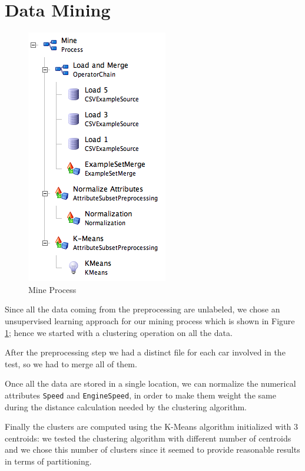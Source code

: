 \section{Data Mining}
\label{section:mining}

\begin{figure}
\vspace{-1.2cm}
\begin{center}
\includegraphics[scale=0.7]{images/mine.png}
\end{center}
\caption{Mine Process}
\label{figure:mine}
\end{figure}

Since all the data coming from the preprocessing are unlabeled, we chose an unsupervised learning approach for our mining process which is shown in Figure \ref{figure:mine}; hence we started with a clustering operation on all the data.

After the preprocessing step we had a distinct file for each car involved in the test, so we had to merge all of them. 

Once all the data are stored in a single location, we can normalize the numerical attributes \texttt{Speed} and \texttt{EngineSpeed}, in order to make them weight the same during the distance calculation needed by the clustering algorithm.

Finally the clusters are computed using the K-Means algorithm initialized with 3 centroids: we tested the clustering algorithm with different number of centroids and we chose this number of clusters since it seemed to provide reasonable results in terms of partitioning.

